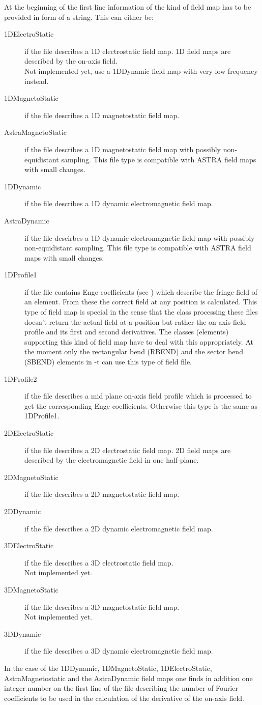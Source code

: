 At the beginning of the first line information of the kind of field map has to be provided in form of a string. This can either be:

\begin{description}
\item[1DElectroStatic]
if the file describes a 1D electrostatic field map. 1D field maps are described by the on-axis field.\\
Not implemented yet, use a 1DDynamic field map with very low frequency instead.
\item[1DMagnetoStatic]
if the file describes a 1D magnetostatic field map.
\item[AstraMagnetoStatic]
if the file describes a 1D magnetostatic field map with possibly non-equidistant sampling. This file type is compatible with ASTRA field maps with small changes.
\item[1DDynamic]
if the file describes a 1D dynamic electromagnetic field map.
\item[AstraDynamic]
if the file descirbes a 1D dynamic electromagnetic field map with possibly non-equidistant sampling. This file type is compatible with ASTRA field maps with small changes.
\item[1DProfile1]
if the file contains Enge coefficients (see \cite{enge}) which describe the fringe field of an element. From these the correct field at any position is calculated. This type of field map is special in the sense that the class processing these files doesn't return the actual field at a position but rather the on-axis field profile and its first and second derivatives. The classes (elements) supporting this kind of field map have to deal with this appropriately. At the moment only the rectangular bend (RBEND) and the sector bend (SBEND) elements in \opal-t can use this type of field file.
\item[1DProfile2]
if the file describes a mid plane on-axis field profile which is processed to get the corresponding Enge coefficients. Otherwise this type is the same as 1DProfile1.
\item[2DElectroStatic]
if the file describes a 2D electrostatic field map. 2D field maps are described by the electromagnetic field in one half-plane.
\item[2DMagnetoStatic]
if the file describes a 2D magnetostatic field map.
\item[2DDynamic]
if the file describes a 2D dynamic electromagnetic field map.
\item[3DElectroStatic]
if the file describes a 3D electrostatic field map.\\
Not implemented yet.
\item[3DMagnetoStatic]
if the file describes a 3D magnetostatic field map.\\
Not implemented yet.
\item[3DDynamic]
if the file describes a 3D dynamic electromagnetic field map.
\end{description}
In the case of the 1DDynamic, 1DMagnetoStatic, 1DElectroStatic, AstraMagnetostatic and the AstraDynamic field maps one finds in addition one integer number on the first line of the file describing the number of Fourier coefficients to be used in the calculation of the derivative of the on-axis field.

